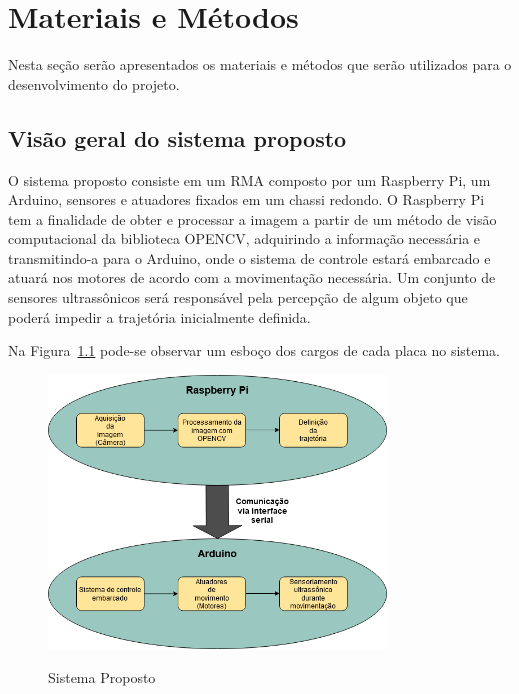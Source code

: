 \chapter{Materiais e Métodos}
\label{chap:mat_met}

Nesta seção serão apresentados os materiais e métodos que serão utilizados para o desenvolvimento do projeto.

\section{Visão geral do sistema proposto}
\label{sec:visaoGeralSist}

O sistema proposto consiste em um RMA composto por um Raspberry Pi, um Arduino, sensores e atuadores fixados em um chassi redondo. O Raspberry Pi tem a finalidade de obter e processar a imagem a partir de um método de visão computacional da biblioteca OPENCV, adquirindo a informação necessária e transmitindo-a para o Arduino, onde o sistema de controle estará embarcado e atuará nos motores de acordo com a movimentação necessária. Um conjunto de sensores ultrassônicos será responsável pela percepção de algum objeto que poderá impedir a trajetória inicialmente definida.

Na Figura~\ref{fig:sistema-proposto} pode-se observar um esboço dos cargos de cada placa no sistema.

\begin{figure}[!hbtp]
  \centering
   \caption{Sistema Proposto}
    \includegraphics[width = 0.8\textwidth]{Caps/Figs/mat-met/Sistema-proposto.png}
   \label{fig:sistema-proposto}
\end{figure}

